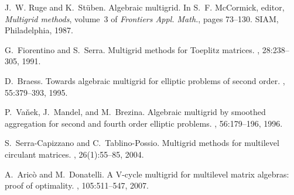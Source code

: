 \documentclass{report}
\begin{document}
\begin{thebibliography}{1}

J.~W. Ruge and K.~St\"uben.
\newblock Algebraic multigrid.
\newblock In S.~F. McCormick, editor, {\em Multigrid methods}, volume~3 of {\em
Frontiers Appl. Math.}, pages 73--130. SIAM, Philadelphia, 1987.

G.~Fiorentino and S.~Serra.
\newblock Multigrid methods for {Toeplitz} matrices.
, 28:238--305, 1991.

D.~Braess.
\newblock Towards algebraic multigrid for elliptic problems of second order.
, 55:379--393, 1995.

P.~Va{\v{n}}ek, J.~Mandel, and M.~Brezina.
\newblock Algebraic multigrid by smoothed aggregation for second and fourth
order elliptic problems.
, 56:179--196, 1996.

S.~Serra-Capizzano and C.~Tablino-Possio.
\newblock Multigrid methods for multilevel circulant matrices.
, 26(1):55--85, 2004.

A.~Aric\`o and M.~Donatelli.
\newblock A {V}-cycle multigrid for multilevel matrix algebras: proof of
optimality.
, 105:511--547, 2007.

\end{thebibliography}
\end{document}
